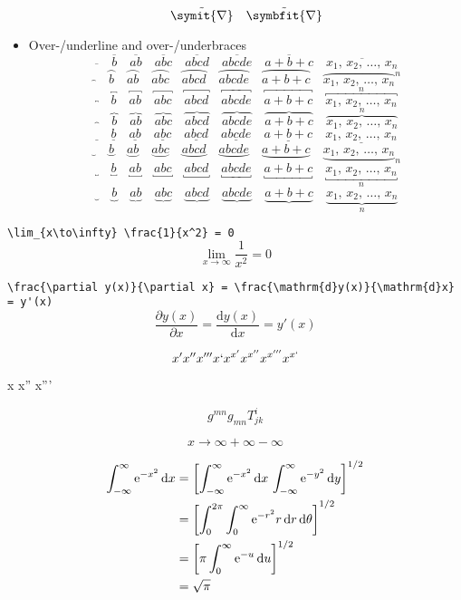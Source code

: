 \documentclass{article}
\def\OVERUNDERLINE#1{%
  #1{} \quad #1{b} \quad #1{ab} \quad #1{abc} \quad #1{abcd} \quad #1{abcde} \quad #1{a+b+c}}
\def\LISTTEXT{x_1, \, x_2, \, \ldots, \, x_n}
\begin{document}
\begin{itemize}
\[          \tilde{\symit{\nabla}} \quad \tilde{\symbfit{\nabla}}
        \]
  \item Over-/underline and over-/underbraces
        \[ \OVERUNDERLINE{\overline}     \quad \overline     {\LISTTEXT}   \]
        \[ \OVERUNDERLINE{\overparen}    \quad \overparen    {\LISTTEXT}^n \]
        \[ \OVERUNDERLINE{\overbracket}  \quad \overbracket  {\LISTTEXT}^n \]
        \[ \OVERUNDERLINE{\overbrace}    \quad \overbrace    {\LISTTEXT}^n \]
        \[ \OVERUNDERLINE{\underline}    \quad \underline    {\LISTTEXT}   \]
        \[ \OVERUNDERLINE{\underparen}   \quad \underparen   {\LISTTEXT}_n \]
        \[ \OVERUNDERLINE{\underbracket} \quad \underbracket {\LISTTEXT}_n \]
        \[ \OVERUNDERLINE{\underbrace}   \quad \underbrace   {\LISTTEXT}_n \]
\end{itemize}

\verb|\lim_{x\to\infty} \frac{1}{x^2} = 0|
\[ \lim_{x\to\infty} \frac{1}{x^2} = 0 \]

\verb|\frac{\partial y(x)}{\partial x} = \frac{\mathrm{d}y(x)}{\mathrm{d}x} = y'(x)|
\[ \frac{\partial y(x)}{\partial x} = \frac{\mathrm{d}y(x)}{\mathrm{d}x} = y'(x) \]

\[ x' x'' x''' x` x^{x'} x^{x''} x^{x'''} x^{x`}\]

{\firatext x x'' x'''}

\[ g^{mn} g_{mn} T^{i}_{jk} \]

\[ x \to \infty + \infty - \infty \]

\def\ee{\mathrm{e}}
\begin{align*}
     \int_{-\infty}^\infty \ee^{-x^2} \dd{x}
  &= \qty[\int_{-\infty}^\infty \ee^{-x^2} \dd{x} \, \int_{-\infty}^\infty \ee^{-y^2} \dd{y}]^{1/2} \\
  &= \qty[\int_0^{2\pi} \int_0^\infty \ee^{-r^2} r \dd{r}\dd{\theta}]^{1/2} \\
  &= \qty[\pi \int_0^\infty \ee^{-u} \dd{u}]^{1/2} \\
  &= \sqrt{\pi}
\end{align*}
\end{document}
